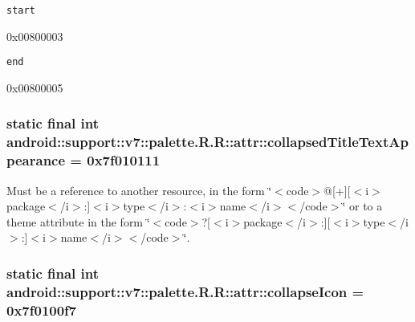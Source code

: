 {\tt start}

0x00800003

{\tt end}

0x00800005\hypertarget{classandroid_1_1support_1_1v7_1_1palette_1_1_r_1_1attr_87ca850601212addb49a8687968b500a}{
\subsubsection[{collapsedTitleTextAppearance}]{\setlength{\rightskip}{0pt plus 5cm}static final int android::support::v7::palette.R.R::attr::collapsedTitleTextAppearance = 0x7f010111}}
\label{classandroid_1_1support_1_1v7_1_1palette_1_1_r_1_1attr_87ca850601212addb49a8687968b500a}


Must be a reference to another resource, in the form \char`\"{}$<$code$>$@\mbox{[}+\mbox{]}\mbox{[}$<$i$>$package$<$/i$>$:\mbox{]}$<$i$>$type$<$/i$>$:$<$i$>$name$<$/i$>$$<$/code$>$\char`\"{} or to a theme attribute in the form \char`\"{}$<$code$>$?\mbox{[}$<$i$>$package$<$/i$>$:\mbox{]}\mbox{[}$<$i$>$type$<$/i$>$:\mbox{]}$<$i$>$name$<$/i$>$$<$/code$>$\char`\"{}. \hypertarget{classandroid_1_1support_1_1v7_1_1palette_1_1_r_1_1attr_8174c7ecd1260402b697d0bc3be69708}{
\subsubsection[{collapseIcon}]{\setlength{\rightskip}{0pt plus 5cm}static final int android::support::v7::palette.R.R::attr::collapseIcon = 0x7f0100f7}}
\label{classandroid_1_1support_1_1v7_1_1palette_1_1_r_1_1attr_8174c7ecd1260402b697d0bc3be69708}


